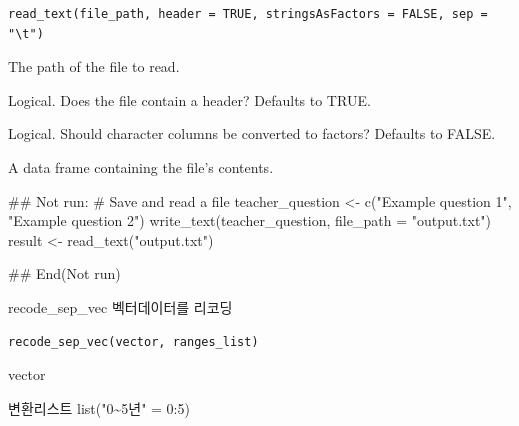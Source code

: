 \documentclass[a4paper]{book}
\begin{document}
%
\begin{Usage}
\begin{verbatim}
read_text(file_path, header = TRUE, stringsAsFactors = FALSE, sep = "\t")
\end{verbatim}
\end{Usage}
%
\begin{Arguments}
\begin{ldescription}
\item[\code{file\_path}] The path of the file to read.

\item[\code{header}] Logical. Does the file contain a header? Defaults to TRUE.

\item[\code{stringsAsFactors}] Logical. Should character columns be converted to factors? Defaults to FALSE.
\end{ldescription}
\end{Arguments}
%
\begin{Value}
A data frame containing the file's contents.
\end{Value}
%
\begin{Examples}
\begin{ExampleCode}
\#\# Not run: 
# Save and read a file
teacher_question <- c("Example question 1", "Example question 2")
write_text(teacher_question, file_path = "output.txt")
result <- read_text("output.txt")

## End(Not run)

\end{ExampleCode}
\end{Examples}
%
\begin{Description}
recode\_sep\_vec 벡터데이터를 리코딩
\end{Description}
%
\begin{Usage}
\begin{verbatim}
recode_sep_vec(vector, ranges_list)
\end{verbatim}
\end{Usage}
%
\begin{Arguments}
\begin{ldescription}
\item[\code{vector}] vector

\item[\code{ranges\_list}] 변환리스트 list("0\textasciitilde{}5년" = 0:5)
\end{ldescription}
\end{Arguments}
\end{document}
